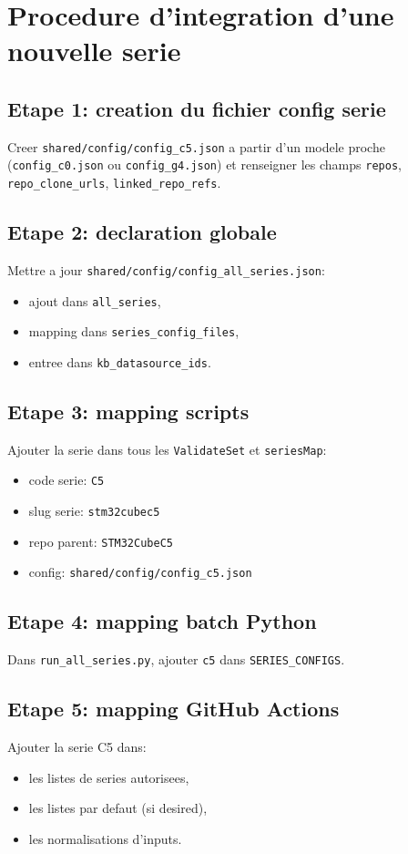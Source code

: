 \documentclass[11pt,a4paper]{article}
\begin{document}
\section{Procedure d'integration d'une nouvelle serie}
\subsection{Etape 1: creation du fichier config serie}
Creer \texttt{shared/config/config\_c5.json} a partir d'un modele proche
(\texttt{config\_c0.json} ou \texttt{config\_g4.json}) et renseigner les champs
\texttt{repos}, \texttt{repo\_clone\_urls}, \texttt{linked\_repo\_refs}.

\subsection{Etape 2: declaration globale}
Mettre a jour \texttt{shared/config/config\_all\_series.json}:
\begin{itemize}[leftmargin=*]
  \item ajout dans \texttt{all\_series},
  \item mapping dans \texttt{series\_config\_files},
  \item entree dans \texttt{kb\_datasource\_ids}.
\end{itemize}

\subsection{Etape 3: mapping scripts}
Ajouter la serie dans tous les \texttt{ValidateSet} et \texttt{seriesMap}:
\begin{itemize}[leftmargin=*]
  \item code serie: \texttt{C5}
  \item slug serie: \texttt{stm32cubec5}
  \item repo parent: \texttt{STM32CubeC5}
  \item config: \texttt{shared/config/config\_c5.json}
\end{itemize}

\subsection{Etape 4: mapping batch Python}
Dans \texttt{run\_all\_series.py}, ajouter \texttt{c5} dans \texttt{SERIES\_CONFIGS}.

\subsection{Etape 5: mapping GitHub Actions}
Ajouter la serie C5 dans:
\begin{itemize}[leftmargin=*]
  \item les listes de series autorisees,
  \item les listes par defaut (si desired),
  \item les normalisations d'inputs.
\end{itemize}
\end{document}

